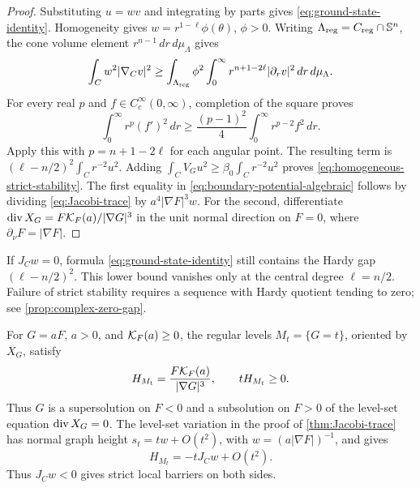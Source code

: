 \begin{proof}
Substituting \(u=wv\) and integrating by parts gives
\eqref{eq:ground-state-identity}.
Homogeneity gives \(w=r^{1-\ell}\phi(\theta)\), \(\phi>0\).
Writing \(\Lambda_{\mathrm{reg}}=C_{\mathrm{reg}}\cap\mathbb S^n\), the cone volume
element \(r^{n-1}\,dr\,d\mu_\Lambda\) gives
\[
 \int_Cw^2|\nabla_Cv|^2
 \geq\int_{\Lambda_{\mathrm{reg}}}\phi^2
       \int_0^\infty r^{n+1-2\ell}|\partial_rv|^2\,dr\,d\mu_\Lambda.
\]
For every real \(p\) and \(f\in C_c^\infty(0,\infty)\), completion of the
square proves
\[
 \int_0^\infty r^p(f')^2\,dr
 \geq\frac{(p-1)^2}{4}\int_0^\infty r^{p-2}f^2\,dr.
\]
Apply this with \(p=n+1-2\ell\) for each angular point.
The resulting term is \((\ell-n/2)^2\int_Cr^{-2}u^2\).
Adding \(\int_CV_Gu^2\geq\beta_0\int_Cr^{-2}u^2\) proves
\eqref{eq:homogeneous-strict-stability}.
The first equality in \eqref{eq:boundary-potential-algebraic} follows by
dividing \eqref{eq:Jacobi-trace} by \(a^4|\nabla F|^3w\).
For the second, differentiate
\(\operatorname{div} X_G=F\mathcal K_F(a)/|\nabla G|^3\) in the unit normal direction on
\(F=0\), where \(\partial_\nu F=|\nabla F|\).
\end{proof}

\begin{remark}
\label{rem:vanishing-trace-strict-stability}
If \(J_Cw=0\), formula \eqref{eq:ground-state-identity} still contains
the Hardy gap \((\ell-n/2)^2\).  This lower bound vanishes only at the central degree
\(\ell=n/2\).
Failure of strict stability requires a sequence with Hardy quotient
tending to zero; see \cref{prop:complex-zero-gap}.
\end{remark}

\begin{remark}
\label{rem:paired-barriers}
For \(G=aF\), \(a>0\), and \(\mathcal K_F(a)\geq0\), the regular levels
\(M_t=\{G=t\}\), oriented by \(X_G\), satisfy
\[
 H_{M_t}=\frac{F\mathcal K_F(a)}{|\nabla G|^3},\qquad
 tH_{M_t}\geq0.
\]
Thus \(G\) is a supersolution on \(F<0\) and a subsolution on
\(F>0\) of the level-set equation \(\operatorname{div} X_G=0\).
The level-set variation in the proof of \cref{thm:Jacobi-trace}
has normal graph height \(s_t=tw+O(t^2)\), with
\(w=(a|\nabla F|)^{-1}\), and gives
\begin{equation}\label{eq:paired-barrier-expansion}
 H_{M_t}=-tJ_Cw+O(t^2).
\end{equation}
Thus \(J_Cw<0\) gives strict local barriers on both sides.
\end{remark}

